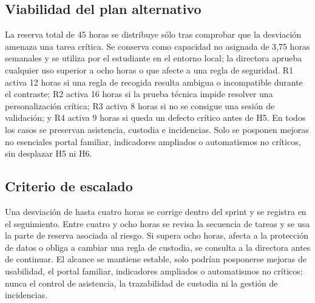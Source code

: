 \subsection{Viabilidad del plan alternativo}\label{sec:2-4-1}

La reserva total de 45 horas se distribuye sólo tras comprobar que la desviación amenaza una tarea crítica. Se conserva como capacidad no asignada de 3,75 horas semanales y se utiliza por el estudiante en el entorno local; la directora aprueba cualquier uso superior a ocho horas o que afecte a una regla de seguridad. R1 activa 12 horas si una regla de recogida resulta ambigua o incompatible durante el contraste; R2 activa 16 horas si la prueba técnica impide resolver una personalización crítica; R3 activa 8 horas si no se consigue una sesión de validación; y R4 activa 9 horas si queda un defecto crítico antes de H5. En todos los casos se preservan asistencia, custodia e incidencias. Solo se posponen mejoras no esenciales portal familiar, indicadores ampliados o automatismos no críticos, sin desplazar H5 ni H6.

\subsection{Criterio de escalado}\label{sec:2-4-2}

Una desviación de hasta cuatro horas se corrige dentro del sprint y se registra en el seguimiento. Entre cuatro y ocho horas se revisa la secuencia de tareas y se usa la parte de reserva asociada al riesgo. Si supera ocho horas, afecta a la protección de datos o obliga a cambiar una regla de custodia, se consulta a la directora antes de continuar. El alcance se mantiene estable, solo podrían posponerse mejoras de usabilidad, el portal familiar, indicadores ampliados o automatismos no críticos; nunca el control de asistencia, la trazabilidad de custodia ni la gestión de incidencias.

